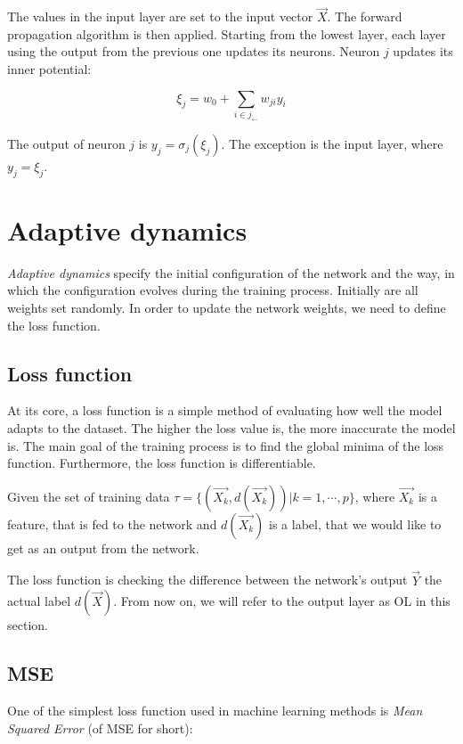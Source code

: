 The values in the input layer are set to the input vector $\overrightarrow{X}$. The forward propagation algorithm is then applied. Starting from the lowest layer, each layer using the output from the previous one updates its neurons. Neuron $j$ updates its inner potential:

$$ \xi_j = w_0 + \sum_{i \in j_{\leftarrow}} w_{ji} y_i $$

The output of neuron $j$ is $y_j = \sigma_j (\xi_j)$. The exception is the input layer, where $y_j = \xi_j$.

\section{Adaptive dynamics}

\textit{Adaptive dynamics} specify the initial configuration of the network and the way, in which the configuration evolves during the training process. Initially are all weights set randomly. In order to update the network weights, we need to define the loss function.

\subsection{Loss function}

At its core, a loss function\cite{loss} is a simple method of evaluating how well the model adapts to the dataset. The higher the loss value is, the more inaccurate the model is. The main goal of the training process is to find the global minima of the loss function. Furthermore, the loss function is differentiable.

Given the set of training data $\tau = \lbrace (\overrightarrow{X_k}, d(\overrightarrow{X_k})) \vert k = 1, \cdots, p \rbrace$, where $\overrightarrow{X_k}$ is a feature, that is fed to the network and $d(\overrightarrow{X_k})$ is a label, that we would like to get as an output from the network.

The loss function is checking the difference between the network's output $\overrightarrow{Y}$ the actual label $d(\overrightarrow{X})$. From now on, we will refer to the output layer as OL in this section.

\subsection*{MSE}

One of the simplest loss function used in machine learning methods is \textit{Mean Squared Error} (of MSE for short):

